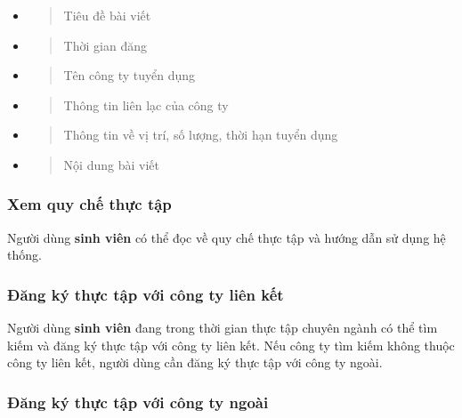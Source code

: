 \documentclass[./../main.tex]{subfiles}
\begin{document}
\begin{itemize}
	\item
	      \begin{quote}
	      	Tiêu đề bài viết
	      \end{quote}
	\item
	      \begin{quote}
	      	Thời gian đăng
	      \end{quote}
	\item
	      \begin{quote}
	      	Tên công ty tuyển dụng
	      \end{quote}
	\item
	      \begin{quote}
	      	Thông tin liên lạc của công ty
	      \end{quote}
	\item
	      \begin{quote}
	      	Thông tin về vị trí, số lượng, thời hạn tuyển dụng
	      \end{quote}
	\item 
	      \begin{quote}
	      	Nội dung bài viết
	      \end{quote}
\end{itemize}
  
\hypertarget{xem-quy-chux1ebf-thux1ef1c-tux1eadp}{%
	\subsubsection{Xem quy chế thực
		tập}\label{xem-quy-chux1ebf-thux1ef1c-tux1eadp}}
  
Người dùng \textbf{sinh viên} có thể đọc về quy chế thực tập và hướng
dẫn sử dụng hệ thống.
  
\hypertarget{ux111ux103ng-kuxfd-thux1ef1c-tux1eadp-vux1edbi-cuxf4ng-ty-liuxean-kux1ebft}{%
	\subsubsection{Đăng ký thực tập với công ty liên
		kết}\label{ux111ux103ng-kuxfd-thux1ef1c-tux1eadp-vux1edbi-cuxf4ng-ty-liuxean-kux1ebft}}
  
Người dùng \textbf{sinh viên} đang trong thời gian thực tập chuyên ngành
có thể tìm kiếm và đăng ký thực tập với công ty liên kết. Nếu công ty
tìm kiếm không thuộc công ty liên kết, người dùng cần đăng ký thực tập
với công ty ngoài.
  
\hypertarget{ux111ux103ng-kuxfd-thux1ef1c-tux1eadp-vux1edbi-cuxf4ng-ty-ngouxe0i}{%
	\subsubsection{Đăng ký thực tập với công ty
		ngoài}\label{ux111ux103ng-kuxfd-thux1ef1c-tux1eadp-vux1edbi-cuxf4ng-ty-ngouxe0i}}
  
\end{document}
